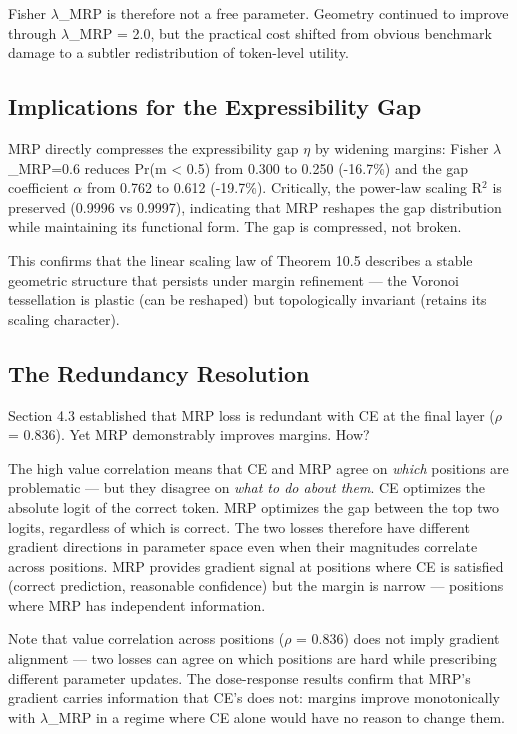 \documentclass[
  11pt,
]{article}
\begin{document}
Fisher $\lambda$\_MRP is therefore not a free parameter. Geometry continued to
improve through $\lambda$\_MRP = 2.0, but the practical cost shifted from
obvious benchmark damage to a subtler redistribution of token-level
utility.

\hypertarget{implications-for-the-expressibility-gap}{%
\subsection{Implications for the Expressibility
Gap}\label{implications-for-the-expressibility-gap}}

MRP directly compresses the expressibility gap $\eta$ by widening margins:
Fisher $\lambda$\_MRP=0.6 reduces Pr(m \textless{} 0.5) from 0.300 to 0.250
(-16.7\%) and the gap coefficient $\alpha$ from 0.762 to 0.612 (-19.7\%).
Critically, the power-law scaling R$^2$ is preserved (0.9996 vs 0.9997),
indicating that MRP reshapes the gap distribution while maintaining its
functional form. The gap is compressed, not broken.

This confirms that the linear scaling law of Theorem 10.5 describes a
stable geometric structure that persists under margin refinement --- the
Voronoi tessellation is plastic (can be reshaped) but topologically
invariant (retains its scaling character).

\hypertarget{the-redundancy-resolution}{%
\subsection{The Redundancy Resolution}\label{the-redundancy-resolution}}

Section 4.3 established that MRP loss is redundant with CE at the final
layer ($\rho$ = 0.836). Yet MRP demonstrably improves margins. How?

The high value correlation means that CE and MRP agree on \emph{which}
positions are problematic --- but they disagree on \emph{what to do
about them}. CE optimizes the absolute logit of the correct token. MRP
optimizes the gap between the top two logits, regardless of which is
correct. The two losses therefore have different gradient directions in
parameter space even when their magnitudes correlate across positions.
MRP provides gradient signal at positions where CE is satisfied (correct
prediction, reasonable confidence) but the margin is narrow ---
positions where MRP has independent information.

Note that value correlation across positions ($\rho$ = 0.836) does not imply
gradient alignment --- two losses can agree on which positions are hard
while prescribing different parameter updates. The dose-response results
confirm that MRP's gradient carries information that CE's does not:
margins improve monotonically with $\lambda$\_MRP in a regime where CE alone
would have no reason to change them.
\end{document}

